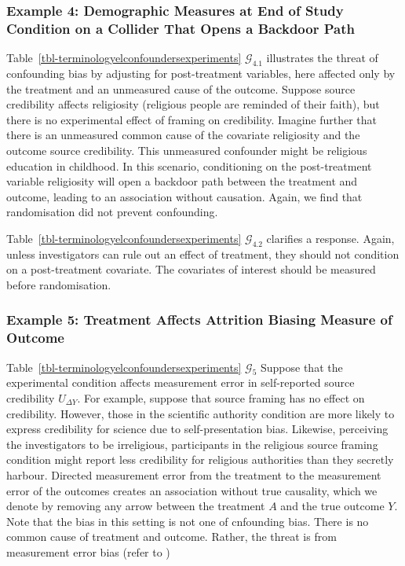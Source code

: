 \documentclass[
  single column]{article}
\begin{document}
\subsubsection{Example 4: Demographic Measures at End of Study Condition
on a Collider That Opens a Backdoor
Path}\label{example-4-demographic-measures-at-end-of-study-condition-on-a-collider-that-opens-a-backdoor-path}

Table~\ref{tbl-terminologyelconfoundersexperiments}
\(\mathcal{G}_{4.1}\) illustrates the threat of confounding bias by
adjusting for post-treatment variables, here affected only by the
treatment and an unmeasured cause of the outcome. Suppose source
credibility affects religiosity (religious people are reminded of their
faith), but there is no experimental effect of framing on credibility.
Imagine further that there is an unmeasured common cause of the
covariate religiosity and the outcome source credibility. This
unmeasured confounder might be religious education in childhood. In this
scenario, conditioning on the post-treatment variable religiosity will
open a backdoor path between the treatment and outcome, leading to an
association without causation. Again, we find that randomisation did not
prevent confounding.

Table~\ref{tbl-terminologyelconfoundersexperiments}
\(\mathcal{G}_{4.2}\) clarifies a response. Again, unless investigators
can rule out an effect of treatment, they should not condition on a
post-treatment covariate. The covariates of interest should be measured
before randomisation.

\subsubsection{Example 5: Treatment Affects Attrition Biasing Measure of
Outcome}\label{example-5-treatment-affects-attrition-biasing-measure-of-outcome}

Table~\ref{tbl-terminologyelconfoundersexperiments} \(\mathcal{G}_{5}\)
Suppose that the experimental condition affects measurement error in
self-reported source credibility \(U_{\Delta Y}\). For example, suppose
that source framing has no effect on credibility. However, those in the
scientific authority condition are more likely to express credibility
for science due to self-presentation bias. Likewise, perceiving the
investigators to be irreligious, participants in the religious source
framing condition might report less credibility for religious
authorities than they secretly harbour. Directed measurement error from
the treatment to the measurement error of the outcomes creates an
association without true causality, which we denote by removing any
arrow between the treatment \(A\) and the true outcome \(Y\). Note that
the bias in this setting is not one of cnfounding bias. There is no
common cause of treatment and outcome. Rather, the threat is from
measurement error bias (refer to
)
\end{document}
